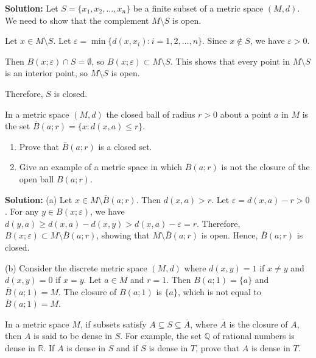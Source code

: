 \textbf{Solution:} Let $S = \{x_1, x_2, \ldots, x_n\}$ be a finite subset of a metric space $(M,d)$. We need to show that the complement $M \setminus S$ is open.

Let $x \in M \setminus S$. Let $\varepsilon = \min\{d(x,x_i) : i = 1,2,\ldots,n\}$. Since $x \notin S$, we have $\varepsilon > 0$.

Then $B(x;\varepsilon) \cap S = \emptyset$, so $B(x;\varepsilon) \subset M \setminus S$. This shows that every point in $M \setminus S$ is an interior point, so $M \setminus S$ is open.

Therefore, $S$ is closed.

\begin{problembox}
In a metric space \((M, d)\) the closed ball of radius \( r > 0 \) about a point \( a \) in \( M \) is the set \( \overline{B}(a; r) = \{x : d(x, a) \leq r\} \).
\begin{enumerate}[label=\alph*)]
\item Prove that \( \overline{B}(a; r) \) is a closed set.
\item Give an example of a metric space in which \( \overline{B}(a; r) \) is not the closure of the open ball \( B(a; r) \).
\end{enumerate}
\end{problembox}

\textbf{Solution:} 
(a) Let $x \in M \setminus \overline{B}(a;r)$. Then $d(x,a) > r$. Let $\varepsilon = d(x,a) - r > 0$. For any $y \in B(x;\varepsilon)$, we have $d(y,a) \geq d(x,a) - d(x,y) > d(x,a) - \varepsilon = r$. Therefore, $B(x;\varepsilon) \subset M \setminus \overline{B}(a;r)$, showing that $M \setminus \overline{B}(a;r)$ is open. Hence, $\overline{B}(a;r)$ is closed.

(b) Consider the discrete metric space $(M,d)$ where $d(x,y) = 1$ if $x \neq y$ and $d(x,y) = 0$ if $x = y$. Let $a \in M$ and $r = 1$. Then $B(a;1) = \{a\}$ and $\overline{B}(a;1) = M$. The closure of $B(a;1)$ is $\{a\}$, which is not equal to $\overline{B}(a;1) = M$.

\begin{problembox}
In a metric space \( M \), if subsets satisfy \( A \subseteq S \subseteq \overline{A} \), where \(\overline{A}\) is the closure of \( A \), then \( A \) is said to be dense in \( S \). For example, the set \( \mathbb{Q} \) of rational numbers is dense in \( \mathbb{R} \). If \( A \) is dense in \( S \) and if \( S \) is dense in \( T \), prove that \( A \) is dense in \( T \).
\end{problembox}


